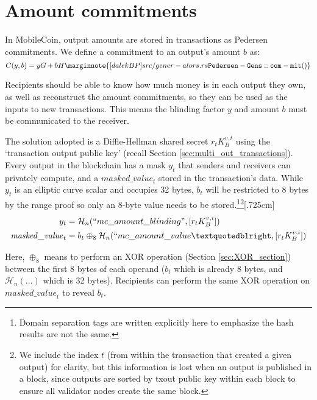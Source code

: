 \section{Amount commitments}
\label{sec:pedersen-ringct}

In MobileCoin, output amounts are stored in transactions as Pedersen commitments. We define a commitment to an output’s amount $b$ as:\vspace{.175cm}
\[C(y,b) = y G + b H\marginnote{[dalekBP] src/gener- ators.rs {\tt Pedersen- Gens::com- mit()}}\]

Recipients should be able to know how much money is in each output they own, as well as reconstruct the amount commitments, so they can be used as the inputs to new transactions. This means the blinding factor $y$ and amount $b$ must be communicated to the receiver.

The solution adopted is a Diffie-Hellman shared secret $r_t K_B^{v,t}$ using the `transaction output public key' (recall Section \ref{sec:multi_out_transactions}). Every output in the blockchain has a mask $y_t$ that senders and receivers can privately compute, and a $\mathit{masked\_value}_t$ stored in the transaction's data. While $y_t$ is an elliptic curve scalar and occupies 32 bytes, $b_t$ will be restricted to 8 bytes by the range proof so only an 8-byte value needs to be stored.\footnote{Domain separation tags are written explicitly here to emphasize the hash results are not the same.}\footnote{We include the index $t$ (from within the transaction that created a given output) for clarity, but this information is lost when an output is published in a block, since outputs are sorted by txout public key within each block to ensure all validator nodes create the same block.}[.725cm]\vspace{.175cm}
\begin{align*}
  y_t &= \mathcal{H}_n(``mc\_amount\_blinding", [r_t K_B^{v,i}]) \\
  \mathit{masked\_value}_t &= b_t \oplus_8 \mathcal{H}_n(``mc\_amount\_value”, [r_t K_B^{v,i}])
\end{align*}

Here, $\oplus_8$ means to perform an XOR operation (Section \ref{sec:XOR_section}) between the first 8 bytes of each operand ($b_t$ which is already 8 bytes, and $\mathcal{H}_n(...)$ which is 32 bytes). Recipients can perform the same XOR operation on $\mathit{masked\_value}_t$ to reveal $b_t$.

